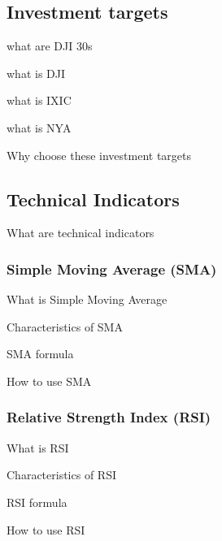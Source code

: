 \documentclass[../main.tex]{subfiles}
\begin{document}
\subsection{Investment targets}
what are DJI 30s

what is DJI

what is IXIC

what is NYA

Why choose these investment targets

\subsection{Technical Indicators}
What are technical indicators

\subsubsection{Simple Moving Average (SMA)}
What is Simple Moving Average

Characteristics of SMA

SMA formula

How to use SMA


\subsubsection{Relative Strength Index (RSI)}
What is RSI

Characteristics of RSI

RSI formula

How to use RSI

\end{document}
